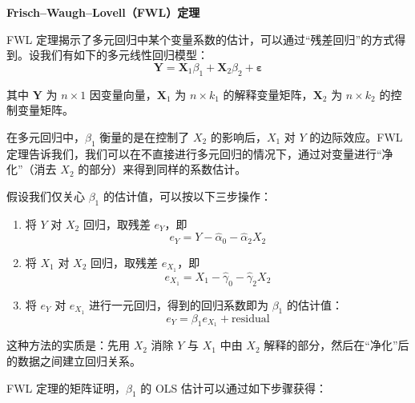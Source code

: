 \textbf{Frisch--Waugh--Lovell（FWL）定理}

FWL 定理揭示了多元回归中某个变量系数的估计，可以通过“残差回归”的方式得到。设我们有如下的多元线性回归模型：
\begin{equation}
\mathbf{Y} = \mathbf{X}_1 \beta_1 + \mathbf{X}_2 \beta_2 + \boldsymbol{\varepsilon}
\end{equation}

其中 $\mathbf{Y}$ 为 $n \times 1$ 因变量向量，$\mathbf{X}_1$ 为 $n \times k_1$ 的解释变量矩阵，$\mathbf{X}_2$ 为 $n \times k_2$ 的控制变量矩阵。

在多元回归中，$\beta_1$ 衡量的是在控制了 $X_2$ 的影响后，$X_1$ 对 $Y$ 的边际效应。FWL 定理告诉我们，我们可以在不直接进行多元回归的情况下，通过对变量进行“净化”（消去 $X_2$ 的部分）来得到同样的系数估计。

假设我们仅关心 $\beta_1$ 的估计值，可以按以下三步操作：
\begin{enumerate}
	\item 将 $Y$ 对 $X_2$ 回归，取残差 $e_Y$，即
	\begin{equation}
	e_Y = Y - \hat{\alpha}_0 - \hat{\alpha}_2 X_2
	\end{equation}

	\item 将 $X_1$ 对 $X_2$ 回归，取残差 $e_{X_1}$，即
	\begin{equation}
	e_{X_1} = X_1 - \hat{\gamma}_0 - \hat{\gamma}_2 X_2
	\end{equation}

	\item 将 $e_Y$ 对 $e_{X_1}$ 进行一元回归，得到的回归系数即为 $\beta_1$ 的估计值：
	\begin{equation}
	e_Y = \beta_1 e_{X_1} + \text{residual}
	\end{equation}
\end{enumerate}

这种方法的实质是：先用 $X_2$ 消除 $Y$ 与 $X_1$ 中由 $X_2$ 解释的部分，然后在“净化”后的数据之间建立回归关系。

FWL 定理的矩阵证明，$\beta_1$ 的 OLS 估计可以通过如下步骤获得：

